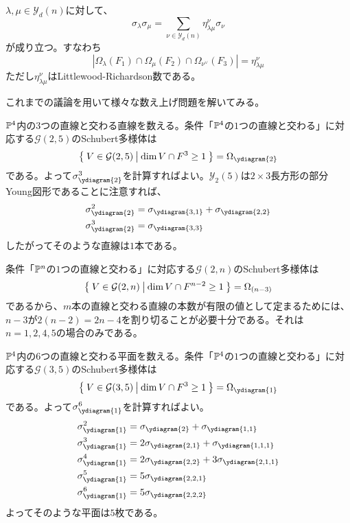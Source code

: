 \documentclass{ltjsreport}
\begin{document}
\begin{cor}
  $\lambda,\mu\in\mathcal{Y}_d(n)$に対して、
  \[
  \sigma_\lambda\sigma_\mu=\sum_{\nu\in\mathcal{Y}_d(n)}\eta_{\lambda\mu}^\nu\sigma_\nu  
  \]
  が成り立つ。すなわち
  \[
  |\Omega_{\lambda}(F_1)\cap\Omega_{\mu}(F_2)\cap\Omega_{\nu^\vee}(F_3)|=\eta_{\lambda\mu}^\nu  
  \]
  ただし$\eta_{\lambda\mu}^\nu$はLittlewood-Richardson数である。
\end{cor}


これまでの議論を用いて様々な数え上げ問題を解いてみる。

\begin{eg}
  $\mathbb{P}^4$内の3つの直線と交わる直線を数える。条件「$\mathbb{P}^4$の$1$つの直線と交わる」に対応する$\mathcal{G}(2,5)$のSchubert多様体は
  \[
  \set{V\in\mathcal{G}(2,5)}{\dim V\cap F^3 \geq 1}=\Omega_{\ydiagram{2}}  
  \]
  である。よって$\sigma_{\ydiagram{2}}^3$を計算すればよい。$\mathcal{Y}_2(5)$は$2\times 3$長方形の部分Young図形であることに注意すれば、
  \begin{align*}
  &\sigma_{\ydiagram{2}}^2=\sigma_{\ydiagram{3,1}}+\sigma_{\ydiagram{2,2}}\\
  &\sigma_{\ydiagram{2}}^3=\sigma_{\ydiagram{3,3}}
  \end{align*}
  したがってそのような直線は$1$本である。
\end{eg}

\begin{eg}
  条件「$\mathbb{P}^n$の$1$つの直線と交わる」に対応する$\mathcal{G}(2,n)$のSchubert多様体は
  \[
  \left\{\:V\in\mathcal{G}(2,n)\:\middle|\:\dim V\cap F^{n-2}\geq 1\:\right\}=\Omega_{(n-3)}  
  \]
  であるから、$m$本の直線と交わる直線の本数が有限の値として定まるためには、$n-3$が$2(n-2)=2n-4$を割り切ることが必要十分である。それは$n=1,2,4,5$の場合のみである。
\end{eg}

\begin{eg}
  $\mathbb{P}^4$内の$6$つの直線と交わる平面を数える。条件「$\mathbb{P}^4$の$1$つの直線と交わる」に対応する$\mathcal{G}(3,5)$のSchubert多様体は
  \[
  \set{V\in\mathcal{G}(3,5)}{\dim V\cap F^3\geq 1}=\Omega_{\ydiagram{1}}  
  \]
  である。よって$\sigma_{\ydiagram{1}}^6$を計算すればよい。
  \begin{align*}
    &\sigma_{\ydiagram{1}}^2
    =\sigma_{\ydiagram{2}}+\sigma_{\ydiagram{1,1}}\\
    &\sigma_{\ydiagram{1}}^3=2\sigma_{\ydiagram{2,1}}+\sigma_{\ydiagram{1,1,1}}\\
    &\sigma_{\ydiagram{1}}^4=2\sigma_{\ydiagram{2,2}}+3\sigma_{\ydiagram{2,1,1}}\\
    &\sigma_{\ydiagram{1}}^5=5\sigma_{\ydiagram{2,2,1}}\\
    &\sigma_{\ydiagram{1}}^6=5\sigma_{\ydiagram{2,2,2}}
  \end{align*}
  よってそのような平面は$5$枚である。
\end{eg}
\end{document}
